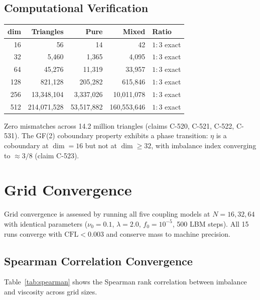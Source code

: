 \documentclass[12pt]{article}
\theoremstyle{definition}
\theoremstyle{plain}
\theoremstyle{remark}
\begin{document}
\subsection{Computational Verification}
\label{sec:apt-verify}

\begin{center}
\begin{tabular}{rrrrl}
\toprule
\textbf{dim} & \textbf{Triangles} & \textbf{Pure} & \textbf{Mixed} & \textbf{Ratio} \\
\midrule
16  & 56 & 14 & 42 & $1:3$ exact \\
32  & 5,460 & 1,365 & 4,095 & $1:3$ exact \\
64  & 45,276 & 11,319 & 33,957 & $1:3$ exact \\
128 & 821,128 & 205,282 & 615,846 & $1:3$ exact \\
256 & 13,348,104 & 3,337,026 & 10,011,078 & $1:3$ exact \\
512 & 214,071,528 & 53,517,882 & 160,553,646 & $1:3$ exact \\
\bottomrule
\end{tabular}
\end{center}

Zero mismatches across 14.2 million triangles (claims C-520, C-521, C-522,
C-531).  The GF(2) coboundary property exhibits a phase transition: $\eta$
is a coboundary at $\dim = 16$ but not at $\dim \geq 32$, with imbalance
index converging to $\approx 3/8$ (claim C-523).

\section{Grid Convergence}
\label{sec:convergence}

Grid convergence is assessed by running all five coupling models at
$N = 16, 32, 64$ with identical parameters ($\nu_0 = 0.1$, $\lambda = 2.0$,
$f_0 = 10^{-5}$, 500 LBM steps).  All 15 runs converge with
$\mathrm{CFL} < 0.003$ and conserve mass to machine precision.

\subsection{Spearman Correlation Convergence}

Table~\ref{tab:spearman} shows the Spearman rank correlation between
imbalance and viscosity across grid sizes.
\end{document}

